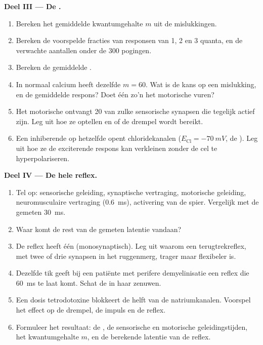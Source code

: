 \begin{problem}
\medskip
\noindent\textbf{Deel III --- De .}
\begin{enumerate}[resume]
  \item Bereken het gemiddelde kwantumgehalte $m$ uit de mislukkingen.
  \item Bereken de voorspelde fracties van responsen van 1, 2 en 3
        quanta, en de verwachte aantallen onder de 300 pogingen.
  \item Bereken de gemiddelde .
  \item In normaal calcium heeft dezelfde  $m = 60$. Wat is de
        kans op een mislukking, en de gemiddelde respons? Doet één
        zo'n  het motorische  vuren?
  \item Het motorische  ontvangt \num{20} van zulke sensorische synapsen
        die tegelijk actief zijn. Leg uit hoe ze optellen en of de drempel
        wordt bereikt.
  \item Een inhiberende  op hetzelfde  opent chloridekanalen
        ($E_{\mathrm{Cl}} = \qty{-70}{mV}$, de ). Leg uit
        hoe ze de exciterende respons kan verkleinen zonder de cel te
        hyperpolariseren.
\end{enumerate}

\medskip
\noindent\textbf{Deel IV --- De hele reflex.}
\begin{enumerate}[resume]
  \item Tel op: sensorische geleiding, synaptische vertraging, motorische
        geleiding, neuromusculaire vertraging (\qty{0.6}{ms}), activering van
        de spier. Vergelijk met de gemeten \qty{30}{ms}.
  \item Waar komt de rest van de gemeten latentie vandaan?
  \item De reflex heeft één  (monosynaptisch). Leg uit waarom een
        terugtrekreflex, met twee of drie synapsen in het ruggenmerg,
        trager maar flexibeler is.
  \item Dezelfde tik geeft bij een patiënte met perifere demyelinisatie een
        reflex die \qty{60}{ms} te laat komt. Schat de 
        in haar zenuwen.
  \item Een dosis tetrodotoxine blokkeert de helft van de natriumkanalen.
        Voorspel het effect op de drempel, de impuls en de reflex.
  \item Formuleer het resultaat: de , de sensorische en
        motorische geleidingstijden, het kwantumgehalte $m$, en de
        berekende latentie van de reflex.
\end{enumerate}
\end{problem}
